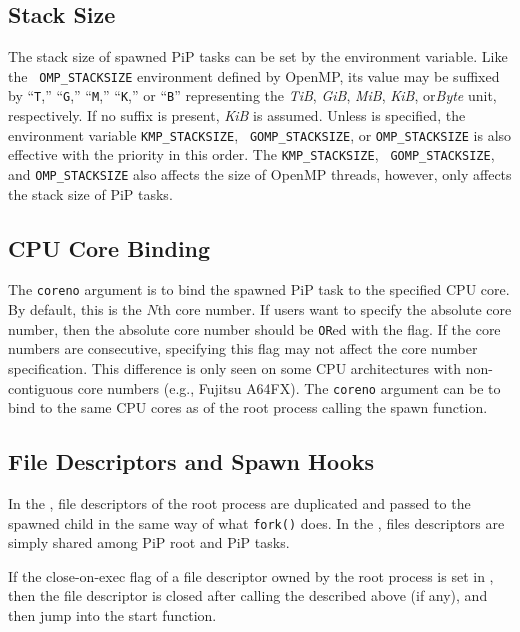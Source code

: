 \subsection{Stack Size}

The stack size of spawned PiP tasks can be set by the
 environment variable. Like the {\tt
  OMP_STACKSIZE} environment defined by OpenMP, its value may
be suffixed by ``{\tt T},'' ``{\tt G},'' ``{\tt M},'' ``{\tt K},'' or
``{\tt B}'' representing the {\it TiB}, {\it GiB}, {\it MiB}, {\it
  KiB}, or{\it Byte} unit, respectively. If no suffix is present,
{\it KiB} is assumed. Unless  is
specified, the environment variable {\tt KMP_STACKSIZE}, {\tt
  GOMP_STACKSIZE}, or {\tt OMP_STACKSIZE} is also effective with the
priority in this order.  The {\tt KMP_STACKSIZE}, {\tt
  GOMP_STACKSIZE}, and {\tt OMP_STACKSIZE} also affects the size of
OpenMP threads, however,  only affects the stack
size of PiP tasks. 

\subsection{CPU Core Binding}

The {\tt coreno} argument is to bind the spawned PiP task to the
specified CPU core. By default, this is the $N$th core number. If
users want to specify the absolute core number, then the absolute core
number should be {\tt OR}ed with the
 flag. If the core numbers are consecutive,
specifying this flag may not affect the core number
specification. This difference is only seen on some CPU architectures
with non-contiguous core numbers (e.g., Fujitsu A64FX).
The {\tt coreno} argument can be  to bind to
the same CPU cores as of the root process calling the spawn function.

\subsection{File Descriptors and Spawn Hooks}\label{sec:hooks}

In the , file descriptors of the root process
are duplicated and passed to the spawned child in the same way of what
{\tt fork()} does. In the , files descriptors
are simply shared among PiP root and PiP tasks. 

If the close-on-exec flag of a file descriptor owned by the root
process is set in , then the file descriptor is
closed after calling the  described above (if
any), and then jump into the start function.  

